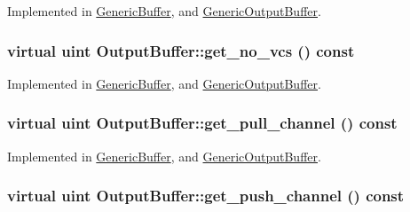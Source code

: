 Implemented in \hyperlink{classGenericBuffer_31e2c8b678d219fcc5d6e351f2f8623c}{GenericBuffer}, and \hyperlink{classGenericOutputBuffer_d7576df13afbc101eb997e35ad417739}{GenericOutputBuffer}.\hypertarget{classOutputBuffer_21ad5222afd999f390df4a495eb48b0a}{
\subsubsection[{get\_\-no\_\-vcs}]{\setlength{\rightskip}{0pt plus 5cm}virtual {\bf uint} OutputBuffer::get\_\-no\_\-vcs () const}}
\label{classOutputBuffer_21ad5222afd999f390df4a495eb48b0a}




Implemented in \hyperlink{classGenericBuffer_528c7b73ffbb3870cab0fc999a01a024}{GenericBuffer}, and \hyperlink{classGenericOutputBuffer_6f5495e1ddd1b524d105d86b083e85cc}{GenericOutputBuffer}.\hypertarget{classOutputBuffer_c4460c1a1ac34667c12cc77c57a393b9}{
\subsubsection[{get\_\-pull\_\-channel}]{\setlength{\rightskip}{0pt plus 5cm}virtual {\bf uint} OutputBuffer::get\_\-pull\_\-channel () const}}
\label{classOutputBuffer_c4460c1a1ac34667c12cc77c57a393b9}




Implemented in \hyperlink{classGenericBuffer_3e87475edf8151591ef57f9ca4cd9a25}{GenericBuffer}, and \hyperlink{classGenericOutputBuffer_c3e3831a4eb7b09b053b511722e89daf}{GenericOutputBuffer}.\hypertarget{classOutputBuffer_bafd65458146d9b383643fef94b38881}{
\subsubsection[{get\_\-push\_\-channel}]{\setlength{\rightskip}{0pt plus 5cm}virtual {\bf uint} OutputBuffer::get\_\-push\_\-channel () const}}
\label{classOutputBuffer_bafd65458146d9b383643fef94b38881}




